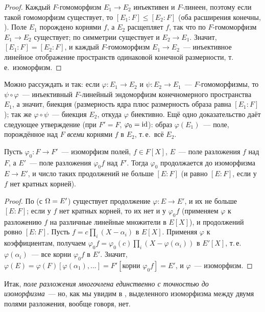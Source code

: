 \begin{proof}
Каждый $F$-гомоморфизм $E_1\to E_2$ инъективен и $F$-линеен, поэтому если такой гомоморфизм существует, то
$[E_1:F]\le[E_2:F]$ (оба расширения конечны, ). Поле $E_1$ порождено корнями $f$, а $E_2$ расщепляет $f$, так что
по  $F$-гомоморфизм $E_1\to E_2$ существует; по симметрии существует и $E_2\to E_1$. Значит,
$[E_1:F]=[E_2:F]$, и каждый $F$-гомоморфизм $E_1\to E_2$~--- инъективное линейное отображение пространств одинаковой
конечной размерности, т.\,е.\ изоморфизм.
\end{proof}

Можно рассуждать и так: если $\varphi\colon E_1\to E_2$ и $\psi\colon E_2\to E_1$~--- $F$-гомоморфизмы, то $\psi\circ\varphi$~---
инъективный $F$-линейный эндоморфизм конечномерного пространства $E_1$, а значит, биекция (размерность ядра плюс
размерность образа равна $[E_1:F]$); так же $\varphi\circ\psi$~--- биекция $E_2$, откуда $\varphi$ биективно. Ещё одно
доказательство даёт следующее утверждение (при $F'=F$, $\varphi_0=\operatorname{id}$): образ $\varphi(E_1)$~--- поле, порождённое над $F$
\emph{всеми} корнями $f$ в $E_2$, т.\,е.\ всё $E_2$.

\begin{corollary}[2.13a]
Пусть $\varphi_0\colon F\to F'$~--- изоморфизм полей, $f\in F[X]$, $E$~--- поле разложения $f$ над $F$, а $E'$~--- поле
разложения $\varphi_0f$ над $F'$. Тогда $\varphi_0$ продолжается до изоморфизма $E\to E'$, и число таких продолжений не
больше $[E:F]$ (и равно $[E:F]$, если у $f$ нет кратных корней).
\end{corollary}

\begin{proof}
По  (с $\Omega=E'$) существует продолжение $\varphi\colon E\to E'$, и их не больше $[E:F]$; если у $f$ нет кратных
корней, то их нет и у $\varphi_0f$ (применяем $\varphi$ к разложению $f$ на различные линейные множители в $E[X]$), и
продолжений ровно $[E:F]$. Пусть $f=c\prod_i(X-\alpha_i)$ в $E[X]$. Применяя $\varphi$ к коэффициентам, получаем
$\varphi_0f=\varphi_0(c)\prod_i(X-\varphi(\alpha_i))$ в $E'[X]$, т.\,е.\ $\varphi(\alpha_i)$~--- все корни $\varphi_0f$ в $E'$. Значит,
$\varphi(E)=\varphi(F)[\varphi(\alpha_1),\dots]=F'[\text{корни }\varphi_0f]=E'$, и $\varphi$~--- изоморфизм.
\end{proof}

Итак, \emph{поле разложения многочлена единственно с точностью до изоморфизма}~--- но, как мы увидим в ,
выделенного изоморфизма между двумя полями разложения, вообще говоря, нет.

